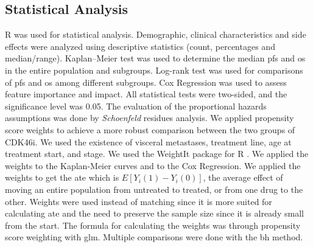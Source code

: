  
\begin{table}
\caption{Descriptive statistics of \ac{cdk46i} group and \ac{et} group. The Drug/combination refers to the actual drug or the combination for CDK4/6}
\centering
\label{tab:stats_ipop_cdk}

\end{table}




\subsection{Statistical Analysis}
R was used for statistical analysis. Demographic, clinical characteristics and side effects were analyzed using descriptive statistics (count, percentages and median/range). Kaplan–Meier test was used to determine the median \ac{pfs} and \ac{os} in the entire population and subgroups. Log-rank test was used for comparisons of \ac{pfs} and \ac{os} among different subgroups. Cox Regression was used to assess feature importance and impact. All statistical tests were two-sided, and the significance level was 0.05. The evaluation of the proportional hazards assumptions was done by \textit{Schoenfeld} residues analysis.
We applied propensity score weights to achieve a more robust comparison between the two groups of CDK4\/6i. We used the existence of visceral metastases, treatment line, age at treatment start, and stage. We used the WeightIt package for R \cite{WeightIt}. We applied the weights to the Kaplan-Meier curves and to the Cox Regression. We applied the weights to get the \ac{ate} which is $E[Y_i(1)-Y_i(0)]$, the average effect of moving an entire population from untreated to treated, or from one drug to the other. Weights were used instead of matching since it is more suited for calculating \ac{ate} and the need to preserve the sample size since it is already small from the start. The formula for calculating the weights was through propensity score weighting with \ac{glm}. Multiple comparisons were done with the \ac{bh} method. 




